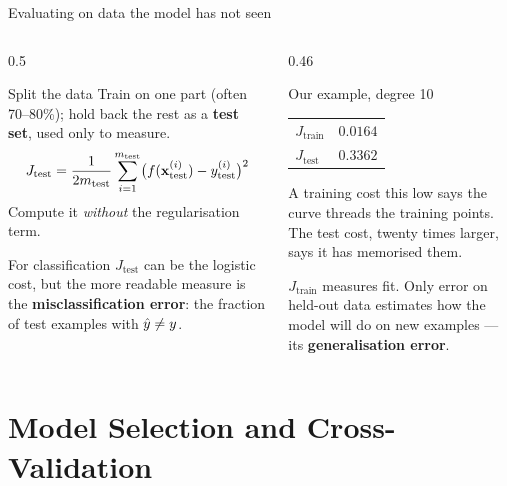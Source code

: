 \documentclass[aspectratio=169,10pt]{beamer}
\begin{document}
\begin{frame}{Evaluating on data the model has not seen}
  \begin{columns}[T,onlytextwidth]
    \begin{column}{0.5\textwidth}
      \begin{block}{Split the data}
        \footnotesize
        Train on one part (often 70--80\%); hold back the rest as a \textbf{test set}, used
        only to measure.
        \[ J_{\text{test}}=\frac{1}{2m_{\text{test}}}\sum_{i=1}^{m_{\text{test}}}
           \bigl(f(\mathbf{x}_{\text{test}}^{(i)})-y_{\text{test}}^{(i)}\bigr)^2 \]
        Compute it \emph{without} the regularisation term.
      \end{block}
      \begin{block}{For classification}
        \footnotesize
        $J_{\text{test}}$ can be the logistic cost, but the more readable measure is the
        \textbf{misclassification error}: the fraction of test examples with
        $\hat{y}\ne y$.
      \end{block}
    \end{column}
    \begin{column}{0.46\textwidth}
      \footnotesize
      \begin{block}{Our example, degree 10}
        \renewcommand{\arraystretch}{1.15}
        \begin{tabular}{@{}lr@{}}
          $J_{\text{train}}$ & $0.0164$\\
          $J_{\text{test}}$  & $0.3362$\\
        \end{tabular}\par
        \vspace{1mm}
        A training cost this low says the curve threads the training points. The test cost,
        twenty times larger, says it has memorised them.
      \end{block}
      \begin{keyidea}
        $J_{\text{train}}$ measures fit. Only error on held-out data estimates how the model
        will do on new examples --- its \textbf{generalisation error}.
      \end{keyidea}
    \end{column}
  \end{columns}
\end{frame}

\section{Model Selection and Cross-Validation}
\end{document}
